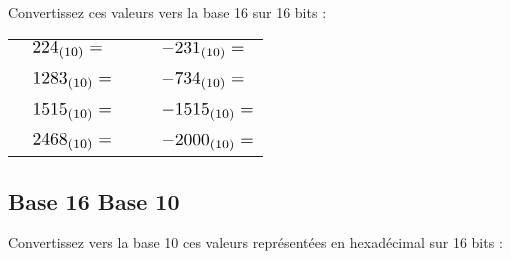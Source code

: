 \documentclass[11pt,a4paper]{article}
\begin{document}
\bigskip

Convertissez ces valeurs vers la base 16 sur 16 bits :

\bigskip

\begin{tabular}{ l l  C{4.5cm}  l l }
  & $ \Scale[1.25]{ 224_{(10)} = } $   & &   & $ \Scale[1.25]{ -231_{(10)} = } $ \\
 & & & & \\
  & $ \Scale[1.25]{ 1283_{(10)} = } $  & &   & $ \Scale[1.25]{ -734_{(10)} = } $ \\
 & & & & \\
  & $ \Scale[1.25]{ 1515_{(10)} = } $  & &   & $ \Scale[1.25]{ -1515_{(10)} = } $ \\
 & & & & \\
  & $ \Scale[1.25]{ 2468_{(10)} = } $  & &   & $ \Scale[1.25]{ -2000_{(10)} = } $ \\
\end{tabular}

\bigskip



\subsection{Base 16 \textrightarrow{} Base 10}

\smallskip

Convertissez vers la base 10 ces valeurs représentées en hexadécimal sur 16 bits :

\bigskip
\end{document}
